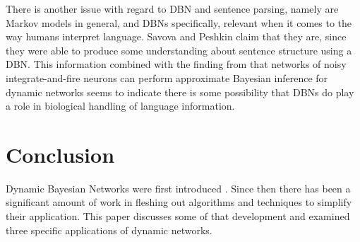 \documentclass{article}
\begin{document}
There is another issue with regard to DBN and sentence parsing, namely are Markov models in general, and DBNs specifically, relevant when it comes to the way humans interpret language. Savova and Peshkin claim that they are, since they were able to produce some understanding about sentence structure using a DBN. This information combined with the finding from \cite{rao2005} that networks of noisy integrate-and-fire neurons can perform approximate Bayesian inference for dynamic networks seems to indicate there is some possibility that DBNs do play a role in biological handling of language information. 
 
\section{Conclusion}
Dynamic Bayesian Networks were first introduced \cite{dk89}. Since then there has been a significant amount of work in fleshing out algorithms and techniques to simplify their application. This paper discusses some of that development and examined three specific applications of dynamic networks. 



\end{document}
